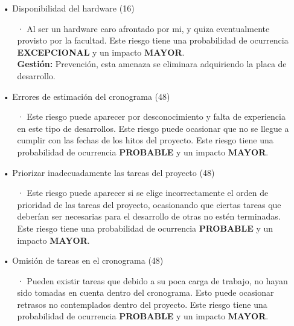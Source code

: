     \begin{itemize}
        \item[•] Disponibilidad del hardware (16)
        \begin{itemize}
            \item[·] Al ser un hardware caro afrontado por mi, y quiza eventualmente provisto por la facultad. Este riesgo tiene una probabilidad de ocurrencia \textbf{EXCEPCIONAL} y un impacto \textbf{MAYOR}.\\
            \textbf{Gestión:} Prevención, esta amenaza se eliminara adquiriendo la placa de desarrollo.
        \end{itemize}
        
        \item[•] Errores de estimación del cronograma (48)
        \begin{itemize}
            \item[·] Este riesgo puede aparecer por desconocimiento y falta de experiencia en este tipo de desarrollos. Este riesgo puede ocasionar que no se llegue a cumplir con las fechas de los hitos del proyecto. Este riesgo tiene una probabilidad de ocurrencia \textbf{PROBABLE} y un impacto \textbf{MAYOR}.
        \end{itemize}
    
        \item[•] Priorizar inadecuadamente las tareas del proyecto (48)
        \begin{itemize}
            \item[·] Este riesgo puede aparecer si se elige incorrectamente el orden de prioridad de las tareas del proyecto, ocasionando que ciertas tareas que deberían ser necesarias para el desarrollo de otras no estén terminadas. Este riesgo tiene una probabilidad de ocurrencia \textbf{PROBABLE} y un impacto \textbf{MAYOR}.
        \end{itemize}
        
        \item[•] Omisión de tareas en el cronograma (48)
        \begin{itemize}
            \item[·] Pueden existir tareas que debido a su poca carga de trabajo, no hayan sido tomadas en cuenta dentro del cronograma. Esto puede ocasionar retrasos no contemplados dentro del proyecto. Este riesgo tiene una probabilidad de ocurrencia \textbf{PROBABLE} y un impacto \textbf{MAYOR}.
        \end{itemize}
    \end{itemize}

